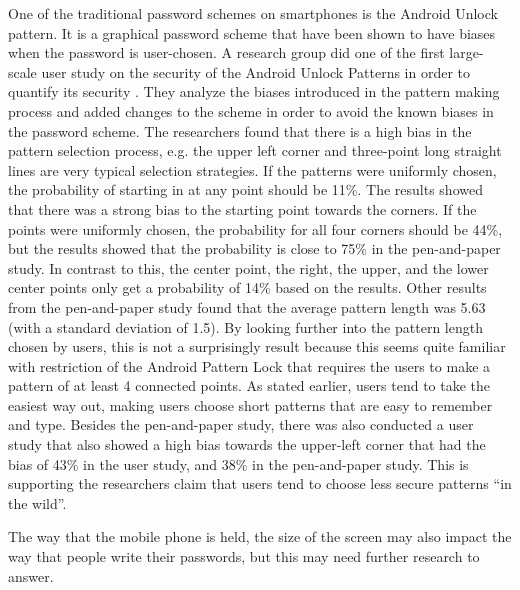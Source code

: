   One of the traditional password schemes on smartphones is the Android Unlock pattern. It is a graphical password scheme that have been shown to have biases when the password is user-chosen. A research group did one of the first large-scale user study on the security of the Android Unlock Patterns in order to quantify its security \cite{Uellenbeck}. They analyze the biases introduced in the pattern making process and added changes to the scheme in order to avoid the known biases in the password scheme. The researchers found that there is a high bias in the pattern selection process, e.g. the upper left corner and three-point long straight lines are very typical selection strategies. If the patterns were uniformly chosen, the probability of starting in at any point should be 11\%. The results showed that there was a strong bias to the starting point towards the corners. If the points were uniformly chosen, the probability for all four corners should be 44\%, but the results showed that the probability is close to 75\% in the pen-and-paper study. In contrast to this, the center point, the right, the upper, and the lower center points only get a probability of 14\% based on the results. Other results from the pen-and-paper study found that the average pattern length was 5.63 (with a standard deviation of 1.5). By looking further into the pattern length chosen by users, this is not a surprisingly result because this seems quite familiar with restriction of the Android Pattern Lock that requires the users to make a pattern of at least 4 connected points. As stated earlier, users tend to take the easiest way out, making users choose short patterns that are easy to remember and type. Besides the pen-and-paper study, there was also conducted a user study that also showed a high bias towards the upper-left corner that had the bias of 43\% in the user study, and 38\% in the pen-and-paper study. This is supporting the researchers claim that users tend to choose less secure patterns ``in the wild''.
  
  The way that the mobile phone is held, the size of the screen may also impact the way that people write their passwords, but this may need further research to answer.

  
